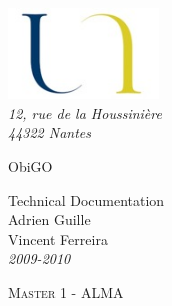 \documentclass[11pt,a4paper]{report}
\begin{document}
\begin{titlepage}



	\begin{flushleft}
		 \includegraphics*[width=4cm]{logo.jpg} \\
		 \textsl{12, rue de la Houssinière}\\
		 \textit{44322 Nantes}
		\hrulefill
	\end{flushleft}


	\vspace{2cm}


	\begin{flushleft}

		{\fontsize{1.4cm}{1.65cm}\selectfont ObiGO  } 	 \\ 
	
		\vspace{1cm}
	
		{\Large Technical Documentation}\\
	
		\vspace{1cm}
		Adrien Guille \\
		Vincent Ferreira \\
		\textit{2009-2010}
	
	\end{flushleft}

	\vspace{2cm}

	\begin{flushleft}
	 	\textsc{Master 1 - ALMA}\\	
	 	\hrulefill
	\end{flushleft}


\end{titlepage}

\tableofcontents
\end{document}
